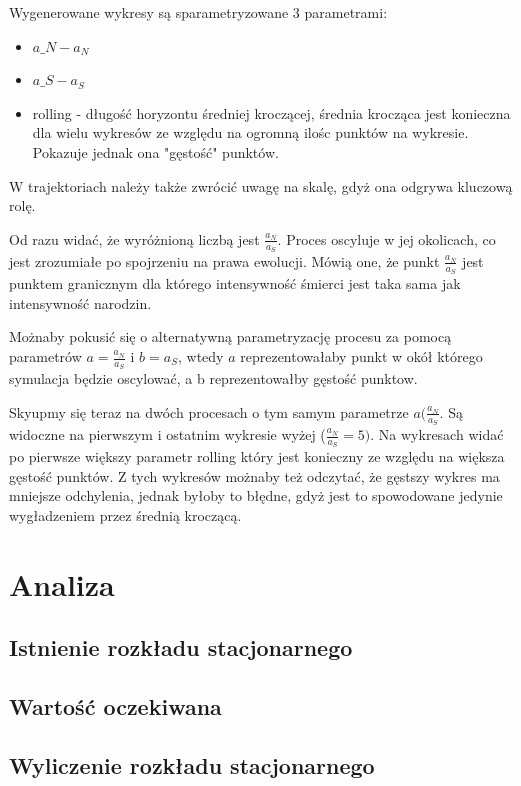\documentclass{article}
\begin{document}
Wygenerowane wykresy są sparametryzowane 3 parametrami: \begin{itemize}
\item $a\_N - a_N$
\item $a\_S - a_S$
\item rolling - długość horyzontu średniej kroczącej, średnia krocząca jest konieczna dla wielu wykresów ze względu na ogromną ilośc punktów na wykresie. Pokazuje jednak ona "gęstość" punktów.
\end{itemize}
W trajektoriach należy także zwrócić uwagę na skalę, gdyż ona odgrywa kluczową rolę.

Od razu widać, że wyróżnioną liczbą jest $\frac{a_N}{a_S}$. Proces oscyluje w jej okolicach, co jest zrozumiałe po spojrzeniu na prawa ewolucji. Mówią one, że punkt $\frac{a_N}{a_S}$ jest punktem granicznym dla którego intensywność śmierci jest taka sama jak intensywność narodzin. 

Możnaby pokusić się o alternatywną parametryzację procesu za pomocą parametrów $a = \frac{a_N}{a_S}$ i $b = a_S$, wtedy $a$ reprezentowałaby punkt w okół którego symulacja będzie oscylować, a b reprezentowałby gęstość punktow.

Skyupmy się teraz na dwóch procesach o tym samym parametrze $a (\frac{a_N}{a_S}$. Są widoczne na pierwszym i ostatnim wykresie wyżej ($\frac{a_N}{a_S} = 5)$. Na wykresach widać po pierwsze większy parametr rolling który jest konieczny ze względu na większa gęstość punktów. Z tych wykresów możnaby też odczytać, że gęstszy wykres ma mniejsze odchylenia, jednak byłoby to błędne, gdyż jest to spowodowane jedynie wygładzeniem przez średnią kroczącą.
\section{Analiza}
\subsection{Istnienie rozkładu stacjonarnego}
\subsection{Wartość oczekiwana}
\subsection{Wyliczenie rozkładu stacjonarnego}
\end{document}
